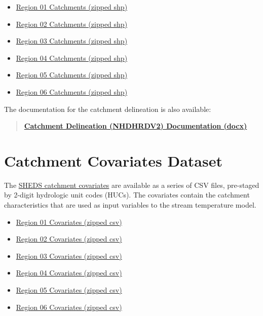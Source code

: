 \documentclass[
]{book}
\providecommand{\tightlist}{%
  \setlength{\itemsep}{0pt}\setlength{\parskip}{0pt}}
\begin{document}
\begin{itemize}
\tightlist
\item
  \href{https://ecosheds.s3.amazonaws.com/necd/delineation/spatial_01.zip}{Region 01 Catchments (zipped shp)}
\item
  \href{https://ecosheds.s3.amazonaws.com/necd/delineation/spatial_02.zip}{Region 02 Catchments (zipped shp)}
\item
  \href{https://ecosheds.s3.amazonaws.com/necd/delineation/spatial_03.zip}{Region 03 Catchments (zipped shp)}
\item
  \href{https://ecosheds.s3.amazonaws.com/necd/delineation/spatial_04.zip}{Region 04 Catchments (zipped shp)}
\item
  \href{https://ecosheds.s3.amazonaws.com/necd/delineation/spatial_05.zip}{Region 05 Catchments (zipped shp)}
\item
  \href{https://ecosheds.s3.amazonaws.com/necd/delineation/spatial_06.zip}{Region 06 Catchments (zipped shp)}
\end{itemize}

The documentation for the catchment delineation is also available:

\begin{quote}
\textbf{\href{https://ecosheds.s3.amazonaws.com/necd/docs/NHDHRDV2_Documentation.docx}{Catchment Delineation (NHDHRDV2) Documentation (docx)}}
\end{quote}

\section{Catchment Covariates Dataset}\label{catchment-covariates-dataset}

The \href{https://ecosheds.github.io/necd/}{SHEDS catchment covariates} are available as a series of CSV files, pre-staged by 2-digit hydrologic unit codes (HUCs). The covariates contain the catchment characteristics that are used as input variables to the stream temperature model.

\begin{itemize}
\tightlist
\item
  \href{https://ecosheds.s3.amazonaws.com/necd/covariates/covariates_01.zip}{Region 01 Covariates (zipped csv)}
\item
  \href{https://ecosheds.s3.amazonaws.com/necd/covariates/covariates_02.zip}{Region 02 Covariates (zipped csv)}
\item
  \href{https://ecosheds.s3.amazonaws.com/necd/covariates/covariates_03.zip}{Region 03 Covariates (zipped csv)}
\item
  \href{https://ecosheds.s3.amazonaws.com/necd/covariates/covariates_04.zip}{Region 04 Covariates (zipped csv)}
\item
  \href{https://ecosheds.s3.amazonaws.com/necd/covariates/covariates_05.zip}{Region 05 Covariates (zipped csv)}
\item
  \href{https://ecosheds.s3.amazonaws.com/necd/covariates/covariates_06.zip}{Region 06 Covariates (zipped csv)}
\end{itemize}
\end{document}
